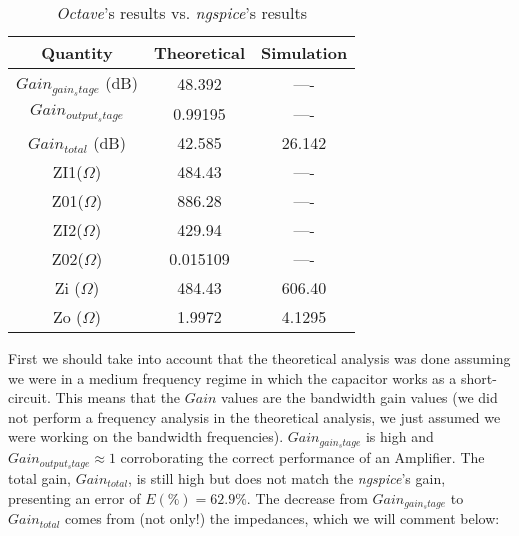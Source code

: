 \begin{center}
    \begin{table}[H]
        \centering
        \begin{tabular}{c|c|c}
          \textbf{Quantity} & \textbf{Theoretical}  & \textbf{Simulation}  \\
          \hline
            $Gain_{gain_stage}$ (dB) &	48.392  & ---- \\
            $Gain_{output_stage}$  &	0.99195  & ----\\
            $Gain_{total}$ (dB)   &	42.585 & 26.142 \\
            ZI1($\Omega$)  &	484.43 & ----\\
            Z01($\Omega$)  &	886.28 & ----\\
            ZI2($\Omega$)  &	429.94 & ----\\
            Z02($\Omega$) & 0.015109 & ----\\
            Zi ($\Omega$)& 484.43 & 606.40\\
            Zo ($\Omega$)& 1.9972 & 4.1295\\
        \end{tabular}
        \caption{\textit{Octave}'s results vs. \textit{ngspice}'s results}
    \end{table}
\end{center}

First we should take into account that the theoretical analysis was done assuming we were in a medium frequency regime in which
the capacitor works as a short-circuit.
This means that the $Gain$ values are the bandwidth gain values (we did not perform a frequency analysis in the theoretical analysis,
we just assumed we were working on the bandwidth frequencies).
$Gain_{gain_stage}$ is high and $Gain_{output_stage} \approx 1$ corroborating the correct performance of an Amplifier. The total gain, $Gain_{total}$, is still high
but does not match the \textit{ngspice}'s gain, presenting an error of $E(\%)=62.9\% $. The decrease from $Gain_{gain_stage}$ to $Gain_{total}$ comes from (not only!) the impedances,
which we will comment below:\par

